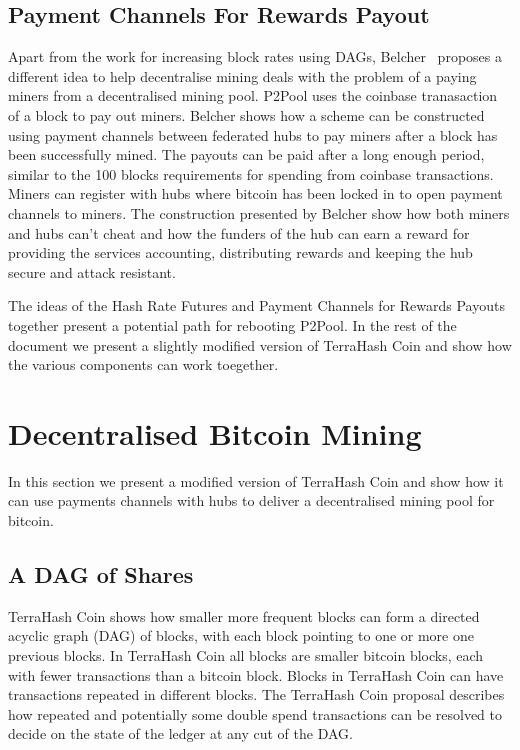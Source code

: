 \documentclass{article}
\begin{document}
\subsection{Payment Channels For Rewards Payout}

Apart from the work for increasing block rates using DAGs,
Belcher~\cite{channels-for-rewards} proposes a different idea to help
decentralise mining deals with the problem of a paying miners from a
decentralised mining pool. P2Pool uses the coinbase tranasaction of a
block to pay out miners. Belcher shows how a scheme can be constructed
using payment channels between federated hubs to pay miners after a
block has been successfully mined. The payouts can be paid after a
long enough period, similar to the 100 blocks requirements for
spending from coinbase transactions. Miners can register with hubs
where bitcoin has been locked in to open payment channels to
miners. The construction presented by Belcher show how both miners and
hubs can't cheat and how the funders of the hub can earn a reward for
providing the services accounting, distributing rewards and keeping
the hub secure and attack resistant.

The ideas of the Hash Rate Futures and Payment Channels for Rewards
Payouts together present a potential path for rebooting P2Pool. In the
rest of the document we present a slightly modified version of
TerraHash Coin and show how the various components can work toegether.

\section{Decentralised Bitcoin Mining}

In this section we present a modified version of TerraHash Coin and
show how it can use payments channels with hubs to deliver a
decentralised mining pool for bitcoin.

\subsection{A DAG of Shares}

TerraHash Coin shows how smaller more frequent blocks can form a
directed acyclic graph (DAG) of blocks, with each block pointing to
one or more one previous blocks. In TerraHash Coin all blocks are
smaller bitcoin blocks, each with fewer transactions than a bitcoin
block. Blocks in TerraHash Coin can have transactions repeated in
different blocks. The TerraHash Coin proposal describes how repeated
and potentially some double spend transactions can be resolved to
decide on the state of the ledger at any cut of the DAG.\
\end{document}
